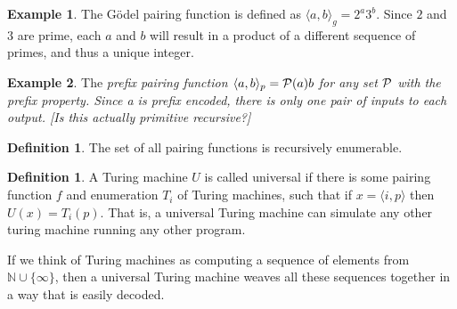 \documentclass{article}
\theoremstyle{definition}
\newtheorem*{thm}{Definition}
\newtheorem*{dfn}{Definition}
\newtheorem*{exm}{Example}
\begin{document}
\begin{exm} The G\"{o}del pairing function is defined as $\langle a, b \rangle_g = 2^a3^b$. Since $2$ and $3$ are prime, each $a$ and $b$ will result in a product of a different sequence of primes, and thus a unique integer.
\end{exm}

\begin{exm} The \em{prefix pairing function} $\langle a, b \rangle_p = {\cal P}(a)b$ for any set ${\cal P}$ with the prefix property. Since a is prefix encoded, there is only one pair of inputs to each output. [Is this actually primitive recursive?]
\end{exm}

\begin{thm}
The set of all pairing functions is recursively enumerable.
\end{thm}

\begin{dfn}
A Turing machine $U$ is called universal if there is some pairing function $f$ and enumeration ${T_i}$ of Turing machines, such that if $x = \langle i, p\rangle$ then $U(x) = T_i(p)$. That is, a universal Turing machine can simulate any other turing machine running any other program.
\end{dfn}

If we think of Turing machines as computing a sequence of elements from ${\mathbb N} \cup \{\infty\}$, then a universal Turing machine weaves all these sequences together in a way that is easily decoded. 
\end{document}
